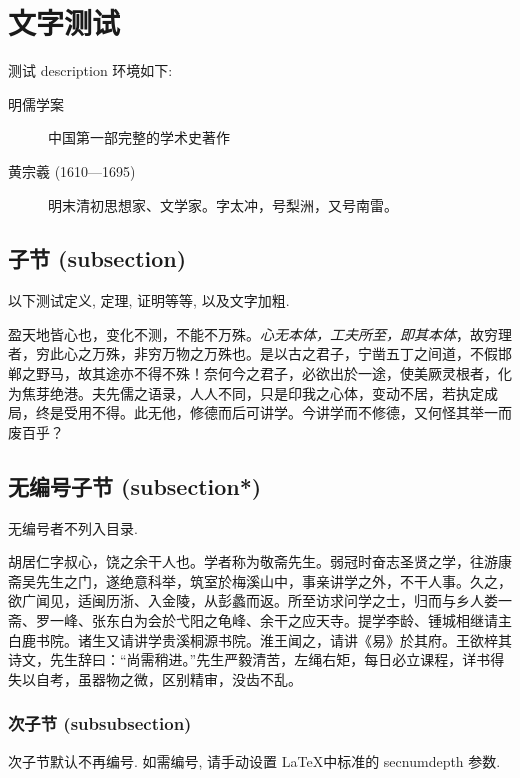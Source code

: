 	\section{文字测试}\label{sec:words}

	测试 \textsf{description} 环境如下:
	\begin{description}
		\item[明儒学案] 中国第一部完整的学术史著作
		\item[黄宗羲 (1610---1695)] 明末清初思想家、文学家。字太冲，号梨洲，又号南雷。
	\end{description}
	
	\subsection{子节 (subsection)}
	以下测试定义, 定理, 证明等等, 以及文字加粗.
	
	\begin{definition}
		盈天地皆心也，变化不测，不能不万殊。\emph{心无本体，工夫所至，即其本体}，故穷理者，穷此心之万殊，非穷万物之万殊也。是以古之君子，宁凿五丁之间道，不假邯郸之野马，故其途亦不得不殊！奈何今之君子，必欲出於一途，使美厥灵根者，化为焦芽绝港。夫先儒之语录，人人不同，只是印我之心体，变动不居，若执定成局，终是受用不得。此无他，修德而后可讲学。今讲学而不修德，又何怪其举一而废百乎？
	\end{definition}

	\subsection*{无编号子节 (subsection*)}
	无编号者不列入目录.
	\begin{proposition}[胡居仁]
		胡居仁字叔心，饶之余干人也。学者称为敬斋先生。弱冠时奋志圣贤之学，往游康斋吴先生之门，遂绝意科举，筑室於梅溪山中，事亲讲学之外，不干人事。久之，欲广闻见，适闽历浙、入金陵，从彭蠡而返。所至访求问学之士，归而与乡人娄一斋、罗一峰、张东白为会於弋阳之龟峰、余干之应天寺。提学李龄、锺城相继请主白鹿书院。诸生又请讲学贵溪桐源书院。淮王闻之，请讲《易》於其府。王欲梓其诗文，先生辞曰：“尚需稍进。”先生严毅清苦，左绳右矩，每日必立课程，详书得失以自考，虽器物之微，区别精审，没齿不乱。
	\end{proposition}

	\subsubsection{次子节 (subsubsection)}
	次子节默认不再编号. 如需编号, 请手动设置 \LaTeX 中标准的 \textsf{secnumdepth} 参数.

